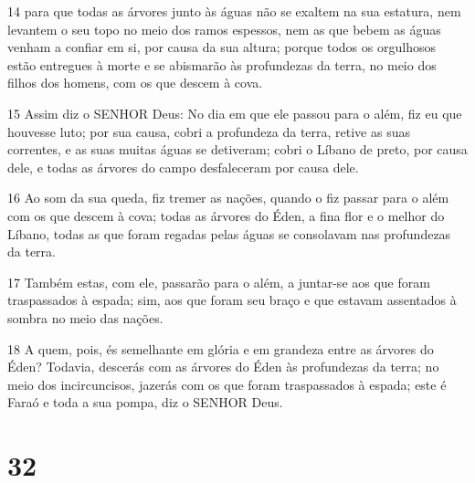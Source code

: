 \par 14 para que todas as árvores junto às águas não se exaltem na sua estatura, nem levantem o seu topo no meio dos ramos espessos, nem as que bebem as águas venham a confiar em si, por causa da sua altura; porque todos os orgulhosos estão entregues à morte e se abismarão às profundezas da terra, no meio dos filhos dos homens, com os que descem à cova.
\par 15 Assim diz o SENHOR Deus: No dia em que ele passou para o além, fiz eu que houvesse luto; por sua causa, cobri a profundeza da terra, retive as suas correntes, e as suas muitas águas se detiveram; cobri o Líbano de preto, por causa dele, e todas as árvores do campo desfaleceram por causa dele.
\par 16 Ao som da sua queda, fiz tremer as nações, quando o fiz passar para o além com os que descem à cova; todas as árvores do Éden, a fina flor e o melhor do Líbano, todas as que foram regadas pelas águas se consolavam nas profundezas da terra.
\par 17 Também estas, com ele, passarão para o além, a juntar-se aos que foram traspassados à espada; sim, aos que foram seu braço e que estavam assentados à sombra no meio das nações.
\par 18 A quem, pois, és semelhante em glória e em grandeza entre as árvores do Éden? Todavia, descerás com as árvores do Éden às profundezas da terra; no meio dos incircuncisos, jazerás com os que foram traspassados à espada; este é Faraó e toda a sua pompa, diz o SENHOR Deus.

\chapter{32}

